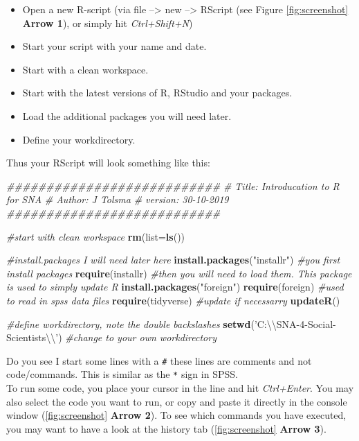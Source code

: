 \documentclass[
]{book}
\newenvironment{Shaded}{\begin{snugshade}}{\end{snugshade}}
\newcommand{\CharTok}[1]{\textcolor[rgb]{0.31,0.60,0.02}{#1}}
\newcommand{\CommentTok}[1]{\textcolor[rgb]{0.56,0.35,0.01}{\textit{#1}}}
\newcommand{\DataTypeTok}[1]{\textcolor[rgb]{0.13,0.29,0.53}{#1}}
\newcommand{\KeywordTok}[1]{\textcolor[rgb]{0.13,0.29,0.53}{\textbf{#1}}}
\newcommand{\NormalTok}[1]{#1}
\newcommand{\StringTok}[1]{\textcolor[rgb]{0.31,0.60,0.02}{#1}}
\providecommand{\tightlist}{%
  \setlength{\itemsep}{0pt}\setlength{\parskip}{0pt}}
\begin{document}
\begin{itemize}
\tightlist
\item
  Open a new R-script (via file --\textgreater{} new --\textgreater{} RScript (see Figure \ref{fig:screenshot} \textbf{Arrow 1}), or simply hit \emph{Ctrl+Shift+N})
\item
  Start your script with your name and date.
\item
  Start with a clean workspace.
\item
  Start with the latest versions of R, RStudio and your packages.
\item
  Load the additional packages you will need later.
\item
  Define your workdirectory.
\end{itemize}

Thus your RScript will look something like this:

\begin{Shaded}
\begin{Highlighting}[numbers=left,,]
\CommentTok{###########################}
\CommentTok{# Title: Introducation to R for SNA}
\CommentTok{# Author: J Tolsma}
\CommentTok{# version: 30-10-2019}
\CommentTok{###########################}

\CommentTok{#start with clean workspace }
\KeywordTok{rm}\NormalTok{(}\DataTypeTok{list=}\KeywordTok{ls}\NormalTok{())}

\CommentTok{#install.packages I will need later here}
\KeywordTok{install.packages}\NormalTok{(}\StringTok{"installr"}\NormalTok{) }\CommentTok{#you  first install packages}
\KeywordTok{require}\NormalTok{(installr) }\CommentTok{#then you will need to load them. This package is used to simply update R}
\KeywordTok{install.packages}\NormalTok{(}\StringTok{"foreign"}\NormalTok{)}
\KeywordTok{require}\NormalTok{(foreign) }\CommentTok{#used to read in spss data files}
\KeywordTok{require}\NormalTok{(tidyverse)}
\CommentTok{#update if necessarry}
\KeywordTok{updateR}\NormalTok{()}

\CommentTok{#define workdirectory, note the double backslashes}
\KeywordTok{setwd}\NormalTok{(}\StringTok{'C:}\CharTok{\textbackslash{}\textbackslash{}}\StringTok{SNA-4-Social-Scientists}\CharTok{\textbackslash{}\textbackslash{}}\StringTok{'}\NormalTok{) }\CommentTok{#change to your own workdirectory}
\end{Highlighting}
\end{Shaded}

Do you see I start some lines with a \texttt{\#} these lines are comments and not code/commands. This is similar as the \texttt{*} sign in SPSS.\\
To run some code, you place your cursor in the line and hit \emph{Ctrl+Enter}. You may also select the code you want to run, or copy and paste it directly in the console window (\ref{fig:screenshot} \textbf{Arrow 2}). To see which commands you have executed, you may want to have a look at the history tab (\ref{fig:screenshot} \textbf{Arrow 3}).
\end{document}
